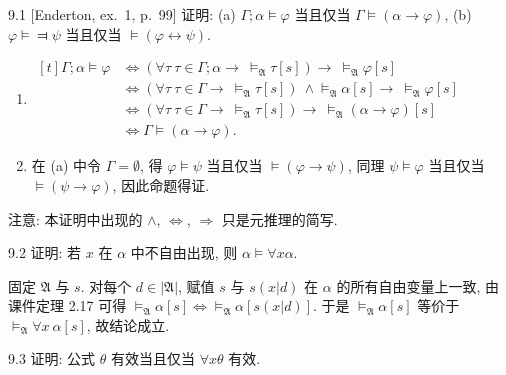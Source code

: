 
\begin{exercise}{9.1}
  [Enderton, ex.~1, p.~99]
  证明: (a) $\Gamma;\alpha\vDash \varphi$ 当且仅当 $\Gamma\vDash(\alpha\to \varphi)$, (b) $\varphi\vDash\Dashv \psi$ 当且仅当 $\vDash(\varphi \leftrightarrow \psi)$.
\end{exercise}

\begin{enumerate}[label=(\alph*)]
  \item
        $\begin{aligned}[t]
            \Gamma;\alpha\vDash \varphi & \Leftrightarrow(\forall\tau\ \tau\in\Gamma;\alpha\rightarrow\ \vDash_{\mathfrak{A}}\tau[s])\rightarrow\ \vDash_{\mathfrak{A}}\varphi[s]                                 \\
                                        & \Leftrightarrow(\forall\tau\ \tau\in \Gamma\rightarrow\ \vDash_{\mathfrak{A}}\tau[s])\ \wedge\vDash_{\mathfrak{A}}\alpha[s]\rightarrow\ \vDash_{\mathfrak{A}}\varphi[s] \\
                                        & \Leftrightarrow(\forall\tau\ \tau\in \Gamma\rightarrow\ \vDash_{\mathfrak{A}}\tau[s])\rightarrow\ \vDash_{\mathfrak{A}}(\alpha\rightarrow \varphi)[s]                   \\
                                        & \Leftrightarrow \Gamma\vDash (\alpha\rightarrow \varphi).
          \end{aligned}$
  \item 在 (a) 中令 $\Gamma=\emptyset$, 得 $\varphi\vDash \psi$ 当且仅当 $\vDash(\varphi\to \psi)$, 同理 $\psi\vDash \varphi$ 当且仅当 $\vDash(\psi\to \varphi)$, 因此命题得证.
\end{enumerate}

注意: 本证明中出现的 $\wedge$, $\Leftrightarrow$, $\Rightarrow$ 只是元推理的简写.

\begin{exercise}{9.2}
  证明: 若 $x$ 在 $\alpha$ 中不自由出现, 则 $\alpha\vDash\forall x \alpha$.
\end{exercise}

固定 $\mathfrak{A}$ 与 $s$. 对每个 $d\in|\mathfrak{A}|$, 赋值 $s$ 与 $s(x|d)$ 在 $\alpha$ 的所有自由变量上一致, 由课件定理 2.17 可得 $\vDash_{\mathfrak{A}}\alpha[s]\Leftrightarrow\vDash_{\mathfrak{A}}\alpha[s(x|d)]$. 于是 $\vDash_{\mathfrak{A}}\alpha[s]$ 等价于 $\vDash_{\mathfrak{A}}\forall x\ \alpha[s]$, 故结论成立.

\begin{exercise}{9.3}
  证明: 公式 $\theta$ 有效当且仅当 $\forall x\theta$ 有效.
\end{exercise}

